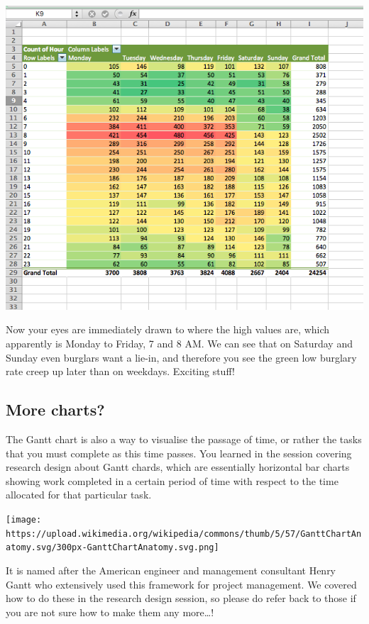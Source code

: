 \documentclass[]{book}
\theoremstyle{definition}
\theoremstyle{definition}
\theoremstyle{definition}
\theoremstyle{remark}
\begin{document}
\includegraphics{imgs/cond_3.png}

Now your eyes are immediately drawn to where the high values are, which
apparently is Monday to Friday, 7 and 8 AM. We can see that on Saturday
and Sunday even burglars want a lie-in, and therefore you see the green
low burglary rate creep up later than on weekdays. Exciting stuff!

\hypertarget{more-charts}{%
\subsection{More charts?}\label{more-charts}}

The Gantt chart is also a way to visualise the passage of time, or
rather the tasks that you must complete as this time passes. You learned
in the session covering research design about Gantt chards, which are
essentially horizontal bar charts showing work completed in a certain
period of time with respect to the time allocated for that particular
task.

\texttt{[image: https://upload.wikimedia.org/wikipedia/commons/thumb/5/57/GanttChartAnatomy.svg/300px-GanttChartAnatomy.svg.png]}

It is named after the American engineer and management consultant Henry
Gantt who extensively used this framework for project management. We
covered how to do these in the research design session, so please do
refer back to those if you are not sure how to make them any
more\ldots{}!
\end{document}
